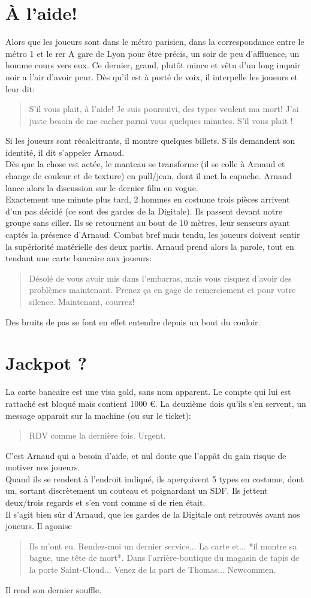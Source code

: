 \documentclass[10pt,a4paper,twocolumn]{article}
\begin{document}
\section{À l'aide!}
Alors que les joueurs sont dans le métro parisien, dans la correspondance entre le métro 1 et le rer A gare de Lyon pour être précis, un soir de peu d'affluence, un homme cours vers eux. Ce  dernier, grand, plutôt mince et vêtu d'un long impair noir a l'air d'avoir peur. Dès qu'il est à porté de voix, il interpelle les joueurs et leur dit:
\begin{quote}
S'il vous plait, à l'aide! Je suis poursuivi, des types veulent ma mort! J'ai juste besoin de me cacher parmi vous quelques minutes. S'il vous plait !
\end{quote}
Si les joueurs sont récalcitrants, il montre quelques billets. S'ils demandent son identité, il dit s'appeler Arnaud.
\\
Dès que la chose est actée, le manteau se transforme (il se colle à Arnaud et change de couleur et de texture) en pull/jean, dont il met la capuche. Arnaud lance alors la discussion sur le dernier film en vogue.\\
Exactement une minute plus tard, 2 hommes en costume trois pièces arrivent d'un pas décidé (ce sont des gardes de la Digitale). Ils passent devant notre groupe sans ciller. Ils se retournent au bout de 10 mètres, leur senseurs ayant captés la présence d'Arnaud. Combat bref mais tendu, les joueurs doivent sentir la supériorité matérielle des deux partis. Arnaud prend alors la parole, tout en tendant une carte bancaire aux joueurs:
\begin{quote}
Désolé de vous avoir mis dans l'embarras, mais vous risquez d'avoir des problèmes maintenant. Prenez ça en gage de remerciement et pour votre silence. Maintenant, courrez!
\end{quote}
Des bruits de pas se font en effet entendre depuis un bout du couloir.
\section{Jackpot ?}
La carte bancaire est une visa gold, sans nom apparent. Le compte qui lui est rattaché est bloqué mais contient 1000 €. La deuxième dois qu'ils s'en servent, un message apparait sur la machine (ou sur le ticket): 
\begin{quote}
RDV comme la dernière fois. Urgent.
\end{quote}
C'est Arnaud qui a besoin d'aide, et nul doute que l'appât du gain risque de motiver nos joueurs. \\
Quand ils se rendent à l'endroit indiqué, ils aperçoivent 5 types en costume, dont un, sortant discrètement un couteau et poignardant un SDF. Ils jettent deux/trois regards et s'en vont comme si de rien était.
\\
Il s'agit bien sûr d'Arnaud, que les gardes de la Digitale ont retrouvés avant nos joueurs. Il agonise
\begin{quote}
Ils m'ont eu. Rendez-moi un dernier service... La carte et... *il montre sa bague, une tête de mort*. Dans l'arrière-boutique du magasin de tapis de la porte Saint-Cloud... Venez de la part de Thomas... Newcommen.
\end{quote}
Il rend son dernier souffle.
\end{document}
